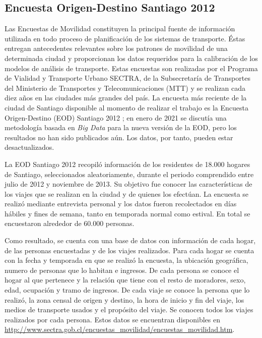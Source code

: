 \subsection{Encuesta Origen-Destino Santiago 2012}\label{sec:eod}

Las Encuestas de Movilidad constituyen la principal fuente de información utilizada en todo proceso de planificación de los sistemas de transporte. Éstas entregan antecedentes relevantes sobre los patrones de movilidad de una determinada ciudad y proporcionan los datos requeridos para la calibración de los modelos de análisis de transporte.  %
Estas encuestas son realizadas por el Programa de Vialidad y Transporte Urbano SECTRA, de la Subsecretaría de Transportes del Ministerio de Transportes y Telecomunicaciones (MTT) y se realizan cada diez años en las ciudades más grandes del país.
La encuesta más reciente de la ciudad de Santiago disponible al momento de realizar el trabajo es la Encuesta Origen-Destino (EOD) Santiago 2012 \cite{SECTRA2014}; en enero de 2021 se discutía \cite{TransporTeinforma} una metodología basada en \textit{Big Data} para la nueva versión de la EOD, pero los resultados no han sido publicados aún. Los datos, por tanto, pueden estar desactualizados.

La EOD Santiago 2012 recopiló información de los residentes de 18.000 hogares de Santiago, seleccionados aleatoriamente, durante el periodo comprendido entre julio de 2012 y noviembre de 2013. Su objetivo fue conocer las características de los viajes que se realizan en la ciudad y de quienes los efectúan. La encuesta se realizó mediante entrevista personal y los datos fueron recolectados en días hábiles y fines de semana, tanto en temporada normal como estival. En total se encuestaron alrededor de 60.000 personas.


Como resultado, se cuenta con una base de datos con información de cada hogar, de las personas encuestadas y de los viajes realizados. Para cada hogar se cuenta con la fecha y temporada en que se realizó la encuesta, la ubicación geográfica, numero de personas que lo habitan e ingresos. De cada persona se conoce el hogar al que pertenece y la relación que tiene con el resto de moradores, sexo, edad, ocupación y tramo de ingresos. De cada viaje se conoce la persona que lo realizó, la zona censal de origen y destino, la hora de inicio y fin del viaje, los medios de transporte usados y el propósito del viaje. Se conocen todos los viajes realizados por cada persona. Estos datos se encuentran disponibles en \url{http://www.sectra.gob.cl/encuestas_movilidad/encuestas_movilidad.htm}.

